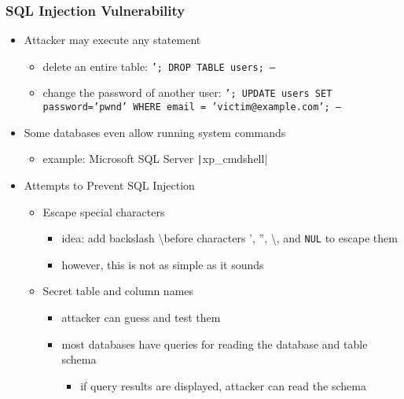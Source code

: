 \documentclass[final]{article}
\begin{document}
\subsubsection*{SQL Injection Vulnerability}
\begin{itemize}[nosep]
    \item Attacker may execute any statement
          \begin{itemize}[nosep]
              \item delete an entire table: \texttt{'; DROP TABLE users; --}
              \item change the password of another user:
                    \texttt{'; UPDATE users SET password='pwnd' WHERE email = 'victim@example.com'; --}
          \end{itemize}
    \item Some databases even allow running system commands
          \begin{itemize}[nosep]
              \item example: Microsoft SQL Server \texttt|xp_cmdshell|
          \end{itemize}
    \item Attempts to Prevent SQL Injection
          \begin{itemize}[nosep]
              \item Escape special characters
                    \begin{itemize}[nosep]
                        \item idea: add backslash \textbackslash before characters ', '', \textbackslash, and \texttt{NUL} to escape them
                        \item however, this is not as simple as it sounds
                    \end{itemize}
              \item Secret table and column names
                    \begin{itemize}[nosep]
                        \item attacker can guess and test them
                        \item most databases have queries for reading the database and table schema
                              \begin{itemize}[nosep]
                                  \item if query results are displayed, attacker can read the schema
                              \end{itemize}
                    \end{itemize}

\end{itemize}
\end{itemize}
\end{document}
